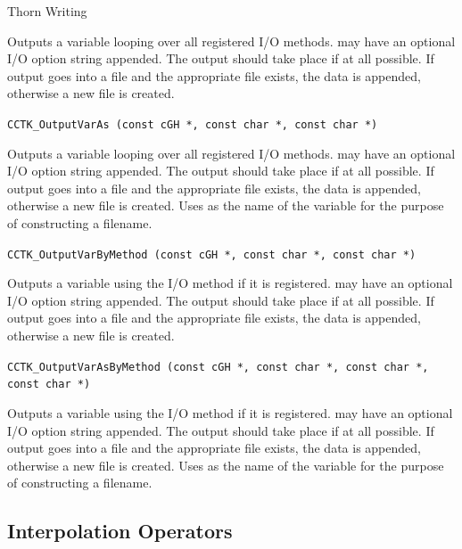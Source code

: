 \begin{cactuspart}{Thorn Writing}
\begin{description}
Outputs a variable  looping over all registered I/O methods.
 may have an optional I/O option string appended.
The output should take place if at all possible.  If output goes into
a file and the appropriate file exists, the data is appended, otherwise
a new file is created.

\item \texttt{CCTK\_OutputVarAs (const cGH *, const char *, const char *)}

Outputs a variable  looping over all registered I/O methods.
 may have an optional I/O option string appended.
The output should take place if at all possible.  If output goes into
a file and the appropriate file exists, the data is appended, otherwise
a new file is created.  Uses  as the name of the variable
for the purpose of constructing a filename.

\item \texttt{CCTK\_OutputVarByMethod (const cGH *, const char *, const char *)}

Outputs a variable  using the I/O method  if it is
registered.  may have an optional I/O option string appended.
The output should take place if at all possible.  If
output goes into a file and the appropriate file exists, the data is
appended, otherwise a new file is created.

\item \texttt{CCTK\_OutputVarAsByMethod (const cGH *,
                                     const char *,
                                     const char *,\\
                                     const char *)}

Outputs a variable  using the I/O method  if it is
registered.  may have an optional I/O option string appended.
The output should take place if at all possible.
If output goes into a file and the appropriate file exists, the data is
appended, otherwise a new file is created.  Uses  as the
name of the variable for the purpose of constructing a filename.

\end{description}


\subsection{Interpolation Operators}
\label{sec:inop}


\end{cactuspart}
